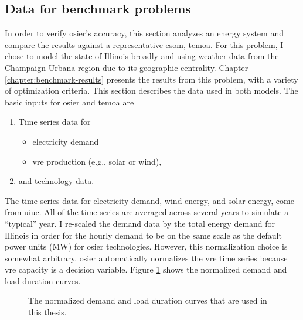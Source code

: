 \subsection{Data for benchmark problems}
 In order to verify \ac{osier}'s accuracy, this section analyzes an energy
system and compare the results against a representative \ac{esom}, \ac{temoa}.
For this problem, I chose to model the state of Illinois broadly and using
weather data from the Champaign-Urbana region due to its geographic centrality.
Chapter \ref{chapter:benchmark-results} presents the results from this problem,
with a variety of optimization criteria. This section describes the data used in
both models. The basic inputs for \ac{osier} and \ac{temoa} are
\begin{enumerate}
    \item Time series data for
    \begin{itemize}
      \item electricity demand
      \item \ac{vre} production (e.g., solar or wind),
    \end{itemize} 
    \item and technology data.
\end{enumerate}
\noindent
The time series data for electricity demand, wind energy, and solar energy, come
from \ac{uiuc}. All of the time series are averaged across several years to
simulate a ``typical'' year. I re-scaled the demand data by the total energy
demand for Illinois in order for the hourly demand to be on the same scale as
the default power units (MW) for \ac{osier} technologies. However, this
normalization choice is somewhat arbitrary. \ac{osier} automatically normalizes
the \ac{vre} time series because \ac{vre} capacity is a decision variable.
Figure \ref{fig:normalized_ldc} shows the normalized demand and load duration
curves.


 \begin{figure}[h]
  \centering
  \resizebox{1\columnwidth}{!}{}
  \caption{The normalized demand and load duration curves that are used in this thesis.}
  \label{fig:normalized_ldc}
\end{figure}

\FloatBarrier